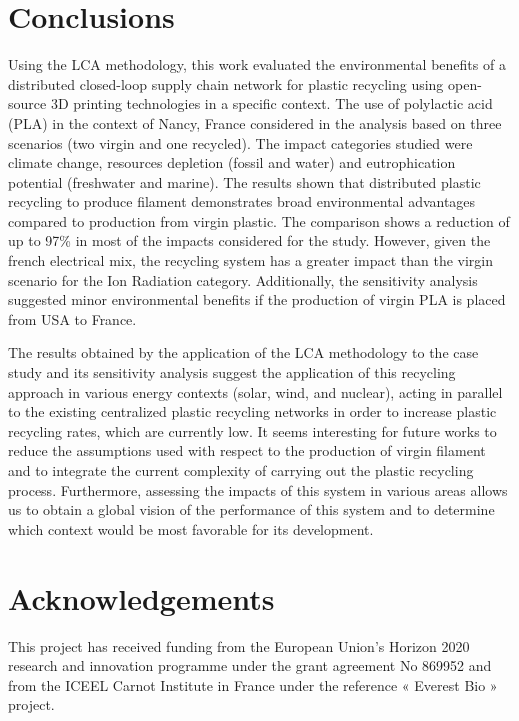 \documentclass[12pt]{elsarticle} %
\begin{document}
\hypertarget{conclusions}{%
\section{Conclusions}\label{conclusions}}

Using the LCA methodology, this work evaluated the environmental benefits of a distributed closed-loop supply chain network for plastic recycling using open-source 3D printing technologies in a specific context.
The use of polylactic acid (PLA) in the context of Nancy, France considered in the analysis based on three scenarios (two virgin and one recycled).
The impact categories studied were climate change, resources depletion (fossil and water) and eutrophication potential (freshwater and marine).
The results shown that distributed plastic recycling to produce filament demonstrates broad environmental advantages compared to production from virgin plastic.
The comparison shows a reduction of up to 97\% in most of the impacts considered for the study.
However, given the french electrical mix, the recycling system has a greater impact than the virgin scenario for the Ion Radiation category.
Additionally, the sensitivity analysis suggested minor environmental benefits if the production of virgin PLA is placed from USA to France.

The results obtained by the application of the LCA methodology to the case study and its sensitivity analysis suggest the application of this recycling approach in various energy contexts (solar, wind, and nuclear), acting in parallel to the existing centralized plastic recycling networks in order to increase plastic recycling rates, which are currently low.
It seems interesting for future works to reduce the assumptions used with respect to the production of virgin filament and to integrate the current complexity of carrying out the plastic recycling process.
Furthermore, assessing the impacts of this system in various areas allows us to obtain a global vision of the performance of this system and to determine which context would be most favorable for its development.

\hypertarget{acknowledgements}{%
\section{Acknowledgements}\label{acknowledgements}}

This project has received funding from the European Union's Horizon 2020 research and innovation programme under the grant agreement No 869952 and from the ICEEL Carnot Institute in France under the reference « Everest Bio » project.
\end{document}
